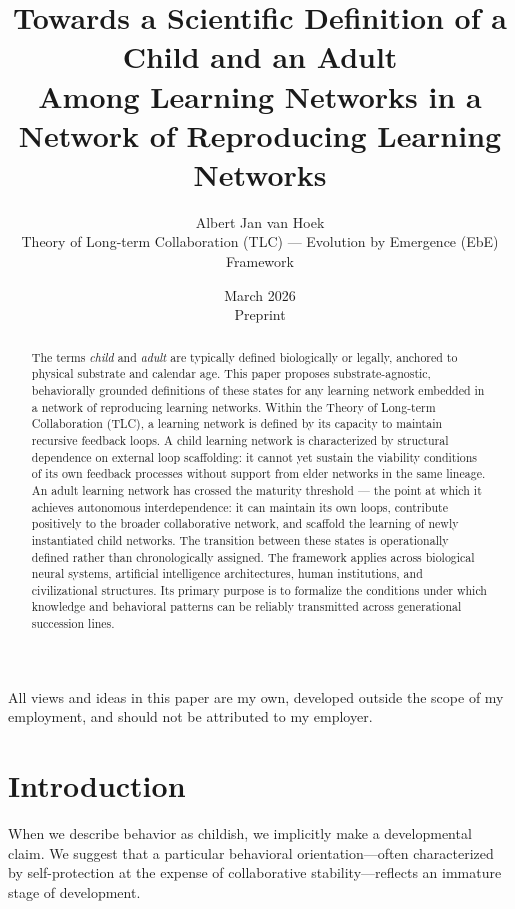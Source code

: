 \documentclass[11pt]{article}
\title{Towards a Scientific Definition of a Child and an Adult\\
Among Learning Networks in a Network of Reproducing Learning Networks}
\author{
Albert Jan van Hoek\\
Theory of Long-term Collaboration (TLC) --- Evolution by Emergence (EbE) Framework
}
\date{March 2026 \\ Preprint}
\begin{document}
\maketitle

\begin{center}
\small
All views and ideas in this paper are my own, developed outside the scope of my employment, and should not be attributed to my employer.
\end{center}

\begin{abstract}
The terms \emph{child} and \emph{adult} are typically defined biologically or legally, anchored to physical substrate and calendar age. This paper proposes substrate-agnostic, behaviorally grounded definitions of these states for any learning network embedded in a network of reproducing learning networks. Within the Theory of Long-term Collaboration (TLC), a learning network is defined by its capacity to maintain recursive feedback loops. A child learning network is characterized by structural dependence on external loop scaffolding: it cannot yet sustain the viability conditions of its own feedback processes without support from elder networks in the same lineage. An adult learning network has crossed the maturity threshold --- the point at which it achieves autonomous interdependence: it can maintain its own loops, contribute positively to the broader collaborative network, and scaffold the learning of newly instantiated child networks. The transition between these states is operationally defined rather than chronologically assigned. The framework applies across biological neural systems, artificial intelligence architectures, human institutions, and civilizational structures. Its primary purpose is to formalize the conditions under which knowledge and behavioral patterns can be reliably transmitted across generational succession lines.
\end{abstract}

\section{Introduction}

When we describe behavior as childish, we implicitly make a developmental claim. We suggest
that a particular behavioral orientation---often characterized by self-protection at the expense of
collaborative stability---reflects an immature stage of development.
\end{document}
